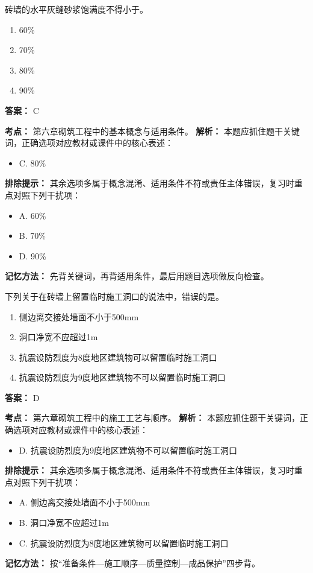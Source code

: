 \documentclass[UTF8,fontset=fandol,11pt]{ctexart}
\begin{document}
\begin{quizbox}[title={第 17 题}]
砖墙的水平灰缝砂浆饱满度不得小于。\\
\begin{enumerate}[label=\Alph*.]
\item 60\%
\item 70\%
\item 80\%
\item 90\%
\end{enumerate}
\textbf{答案：} C
\vspace{0.25em}
\begin{answerbox}[title={考点解析}]
\textbf{考点：} 第六章砌筑工程中的基本概念与适用条件。
\textbf{解析：} 本题应抓住题干关键词，正确选项对应教材或课件中的核心表述：
\begin{itemize}
\item C. 80\%
\end{itemize}
\textbf{排除提示：} 其余选项多属于概念混淆、适用条件不符或责任主体错误，复习时重点对照下列干扰项：
\begin{itemize}
\item A. 60\%
\item B. 70\%
\item D. 90\%
\end{itemize}
\textbf{记忆方法：} 先背关键词，再背适用条件，最后用题目选项做反向检查。
\end{answerbox}
\end{quizbox}

\begin{quizbox}[title={第 18 题}]
下列关于在砖墙上留置临时施工洞口的说法中，错误的是。\\
\begin{enumerate}[label=\Alph*.]
\item 侧边离交接处墙面不小于500mm
\item 洞口净宽不应超过1m
\item 抗震设防烈度为8度地区建筑物可以留置临时施工洞口
\item 抗震设防烈度为9度地区建筑物不可以留置临时施工洞口
\end{enumerate}
\textbf{答案：} D
\vspace{0.25em}
\begin{answerbox}[title={考点解析}]
\textbf{考点：} 第六章砌筑工程中的施工工艺与顺序。
\textbf{解析：} 本题应抓住题干关键词，正确选项对应教材或课件中的核心表述：
\begin{itemize}
\item D. 抗震设防烈度为9度地区建筑物不可以留置临时施工洞口
\end{itemize}
\textbf{排除提示：} 其余选项多属于概念混淆、适用条件不符或责任主体错误，复习时重点对照下列干扰项：
\begin{itemize}
\item A. 侧边离交接处墙面不小于500mm
\item B. 洞口净宽不应超过1m
\item C. 抗震设防烈度为8度地区建筑物可以留置临时施工洞口
\end{itemize}
\textbf{记忆方法：} 按“准备条件—施工顺序—质量控制—成品保护”四步背。
\end{answerbox}
\end{quizbox}
\end{document}
